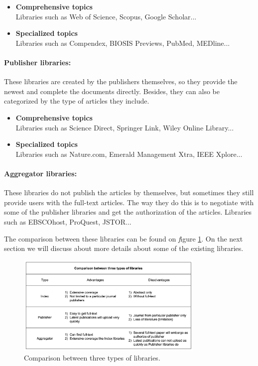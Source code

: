 	\begin{itemize}		
		\item\textbf{Comprehensive topics}\\Libraries such as Web of Science, Scopus, Google Scholar...
		\item\textbf{Specialized topics}\\Libraries such as Compendex, BIOSIS Previews, PubMed, MEDline...		
	\end{itemize}
	
\paragraph{Publisher libraries:}
	These libraries are created by the publishers themselves, so they provide the newest and complete the documents directly.
	Besides, they can also be categorized by the type of articles they include.
	
	\begin{itemize}		
		\item\textbf{Comprehensive topics}\\Libraries such as Science Direct, Springer Link, Wiley Online Library...
		\item\textbf{Specialized topics}\\Libraries such as Nature.com, Emerald Management Xtra, IEEE Xplore...	
	\end{itemize}
	
\paragraph{Aggregator libraries:}
	These libraries do not publish the articles by themselves, but sometimes they still provide users with the full-text articles.
	The way they do this is to negotiate with some of the publisher libraries and get the authorization of the articles.
	Libraries such as EBSCOhost, ProQuest, JSTOR...

	The comparison between these libraries can be found on  \textit figure \ref{WBC1}.
	On the next section we will discuss about more details about some of the existing libraries.

\begin{figure}[htb]
	\begin{center}
		\includegraphics[width=0.8\textwidth]{Wolverine_Background_Chart_1}
	\end{center}
	\caption{Comparison between three types of libraries.\label{WBC1}}
\end{figure}
\newpage

